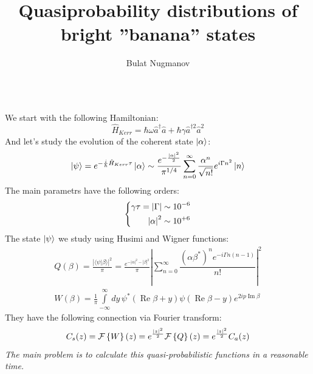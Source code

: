 \documentclass[25pt, a0paper, portrait]{tikzposter}
\title{Quasiprobability distributions of bright ''banana'' states}
\author{Bulat Nugmanov}
\institute{RQC / MIPT}
\DeclareMathOperator*{\Real}{Re}
\DeclareMathOperator*{\Imag}{Im}
\begin{document}
\maketitle

\begin{columns}
{
    We start with the following Hamiltonian:
    \begin{equation*}
        \hat{H}_{Kerr} = \hbar \omega \hat{a}^{\dagger}\hat{a} + \hbar\gamma \hat{a}^{\dagger2}\hat{a}^{2}
    \end{equation*}
    And let's study the evolution of the coherent state $\ket{\alpha}$:
    \begin{equation*}
        \ket{\psi} = e^{-\frac{i}{\hbar} \hat{H}_{Kerr} \tau} \ket{\alpha} \sim \frac{e^{-\frac{\abs{\alpha}^2}{2}}}{\pi^{1/4}} 
        \sum\limits_{n=0}^{\infty}\frac{\alpha^n}{\sqrt{n!}}e^{i\Gamma n^2}\ket{n}
    \end{equation*}
    The main parametrs have the following orders:
    \begin{equation*}
    \left\{
    \begin{aligned}
        \gamma\tau = \abs{\Gamma}&\sim 10^{-6}\\
        \abs{\alpha}^2&\sim 10^{+6}
    \end{aligned}
    \right.
    \end{equation*}
    The state $\ket{\psi}$ we study using Husimi and Wigner functions:
    \begin{equation*}
    \begin{aligned}
        Q(\beta) = \frac{\left|\langle\psi |\beta\rangle\right|^2}{\pi} =
        \frac{e^{-|\alpha|^2-|\beta|^2}}{\pi}\left|
        \sum\limits_{n = 0}^{\infty}\dfrac{\left(\alpha \beta^*\right)^n e^{-i \Gamma n(n-1)}}{n!}\right|^2\\
        W(\beta)=\frac{1}{\pi}\int\limits_{-\infty}^{\infty}dy\, \psi^*(\Real\beta+y)\psi(\Real \beta-y)e^{2ip\Imag \beta}
    \end{aligned}
    \end{equation*}
    They have the following connection via Fourier transform:
    \begin{equation*}
        C_s(z) = \mathcal{F}\left\{W\right\}(z) = e^{\frac{\abs{z}^2}{2}} \mathcal{F}\left\{Q\right\}(z) = e^{\frac{\abs{z}^2}{2}} C_a(z)
    \end{equation*}
    \textit{The main problem is to calculate this quasi-probabilistic functions in a reasonable time.}
}
\end{columns}
\end{document}
